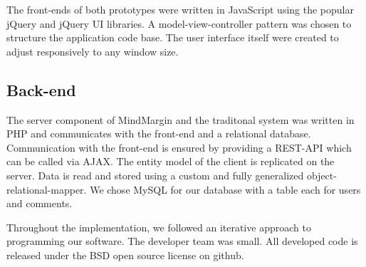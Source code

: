 The front-ends of both prototypes were written in JavaScript using the popular jQuery and jQuery UI libraries. A model-view-controller pattern was chosen to structure the application code base. The user interface itself were created to adjust responsively to any window size.

\subsection{Back-end}
The server component of MindMargin and the traditonal system was written in PHP and communicates with the front-end and a relational database. Communication with the front-end is ensured by providing a REST-API which can be called via AJAX. The entity model of the client is replicated on the server. Data is read and stored using a custom and fully generalized object-relational-mapper. We chose MySQL for our database with a table each for users and comments.

Throughout the implementation, we followed an iterative approach to programming our software. The developer team was small. All developed code is released under the BSD open source license on github.